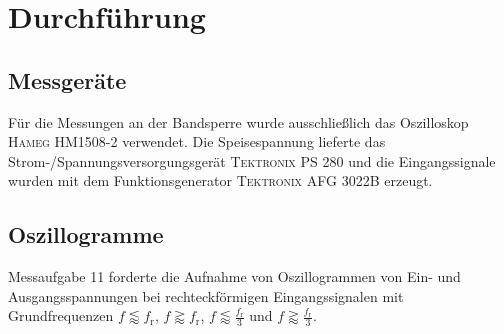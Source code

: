 \documentclass[numbers=noenddot,12pt,a4paper]{scrartcl}
\newcommand{\ix}[1]{_\text{#1}}
\begin{document}
\section{Durchführung}
\subsection{Messgeräte}
Für die Messungen an der Bandsperre wurde ausschließlich das Oszilloskop \textsc{Hameg HM1508-2} verwendet. Die Speisespannung lieferte das Strom-/Spannungsversorgungsgerät \textsc{Tektronix PS 280} und die Eingangssignale wurden mit dem Funktionsgenerator \textsc{Tektronix AFG 3022B} erzeugt.
\subsection{Oszillogramme}
Messaufgabe 11 forderte die Aufnahme von Oszillogrammen von Ein- und Ausgangsspannungen bei rechteckförmigen Eingangssignalen mit Grundfrequenzen $f\lessapprox f\ix{r}$, $f\gtrapprox f\ix{r}$, $f\lessapprox \frac{f\ix{r}}{3}$ und $f\gtrapprox \frac{f\ix{r}}{3}$.
\end{document}
